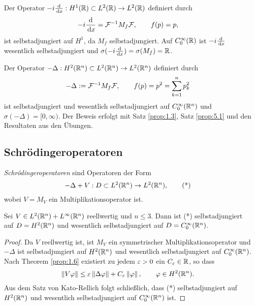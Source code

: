 \begin{bsp}
\begin{bspenum}
\item Der Operator $-i\frac{\mathrm{d}}{\,\mathrm{d} x}: H^1(\mathbb{R})\subset L^2(\mathbb{R}) \to L^2(\mathbb{R})$
definiert durch
\begin{align*}
-i\frac{\mathrm{d}}{\,\mathrm{d} x} = \mathcal{F}^{-1}M_f\mathcal{F},\qquad f(p)=p,
\end{align*}
ist selbstadjungiert auf $H^1$, da $M_f$ selbstadjungiert. Auf $C_0^\infty(\mathbb{R})$
ist $-i\frac{\mathrm{d}}{\,\mathrm{d} x}$ wesentlich selbstadjungiert und
$\sigma(-i\frac{\mathrm{d}}{\,\mathrm{d} x}) = \sigma(M_f) = \mathbb{R}$.
\item Der Operator $-\Delta : H^2(\mathbb{R}^n)\subset L^2(\mathbb{R}^n)\to L^2(\mathbb{R}^n)$ definiert
durch
\begin{align*}
-\Delta := \mathcal{F}^{-1}M_f\mathcal{F},\qquad f(p) = p^2 = \sum_{k=1}^n p_k^2
\end{align*}
ist selbstadjungiert und wesentlich selbstadjungiert auf $C_0^\infty(\mathbb{R}^n)$ und
$\sigma(-\Delta) = [0,\infty)$. Der Beweis erfolgt mit Satz
\ref{prop:1.3}, Satz \ref{prop:5.1} und den Resultaten aus den Übungen.\bsphere
\end{bspenum}
\end{bsp}

\subsection{Schrödingeroperatoren}

\begin{defn*}
\emph{Schrödingeroperatoren} sind Operatoren der Form
\begin{align*}
-\Delta + V : D\subset L^2(\mathbb{R}^n)\to L^2(\mathbb{R}^n),\tag{*}
\end{align*}
wobei $V=M_V$ ein Multiplikationsoperator ist.\fishhere
\end{defn*}

\begin{thm}
\label{prop:5.2}
Sei $V \in L^2(\mathbb{R}^n)  + L^\infty(\mathbb{R}^n)$ reellwertig und $n\le 3$. Dann ist
(*) selbstadjungiert auf $D=H^2(\mathbb{R}^n)$ und wesentlich selbstadjungiert auf
$D=C_0^\infty(\mathbb{R}^n)$.\fishhere
\end{thm}
\begin{proof}
Da $V$ reellwertig ist, ist $M_V$ ein symmetrischer Multiplikationsoperator und
$-\Delta$ ist selbstadjungiert auf $H^2(\mathbb{R}^n)$ und wesentlich selbstadjungiert
auf $C_0^\infty(\mathbb{R}^n)$. Nach Theorem \ref{prop:1.6} existiert zu jedem $\varepsilon > 0$
ein $C_\varepsilon\in\mathbb{R}$, so dass
\begin{align*}
\left\|V\varphi\right\| \le \varepsilon \left\|\Delta \varphi\right\| + C_\varepsilon \left\|\varphi\right\|,\qquad \varphi\in
H^2(\mathbb{R}^n).
\end{align*}
Aus dem Satz von Kato-Rellich folgt schließlich, dass (*) selbstadjungiert auf
$H^2(\mathbb{R}^n)$ und wesentlich selbstadjungiert auf $C_0^\infty(\mathbb{R}^n)$ ist.\qedhere
\end{proof}


